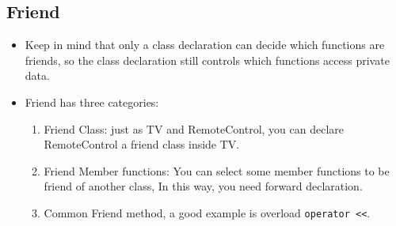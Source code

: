 \documentclass[a4paper,11pt,twoside]{book}
\begin{document}
\subsection{Friend}

    \begin{itemize}
        \item Keep in mind that only a class declaration can decide which functions are friends, so the class declaration still controls which functions access private data.
        \item  Friend has three categories:

	\begin{enumerate}
		\item Friend Class: just as TV and RemoteControl, you can declare RemoteControl a friend class inside TV.
		
		\item Friend Member functions: You can select some member functions to be friend of another class, In this way, you need forward declaration.  
		
		\item Common Friend method, a good example is overload \verb=operator <<=. 
	\end{enumerate}

    \end{itemize}
\end{document}
